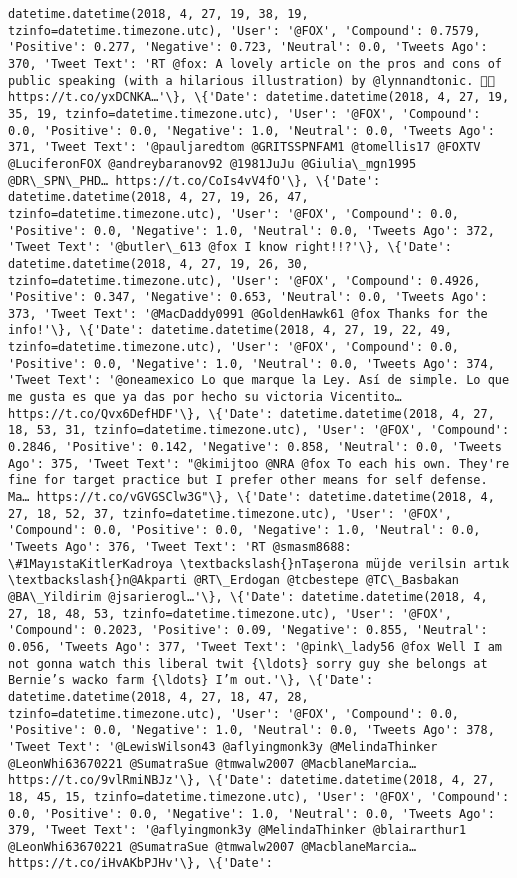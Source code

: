 \documentclass[11pt]{article}
\begin{document}
\begin{Verbatim}[commandchars=\\\{\}]
datetime.datetime(2018, 4, 27, 19, 38, 19, tzinfo=datetime.timezone.utc), 'User': '@FOX', 'Compound': 0.7579, 'Positive': 0.277, 'Negative': 0.723, 'Neutral': 0.0, 'Tweets Ago': 370, 'Tweet Text': 'RT @fox: A lovely article on the pros and cons of public speaking (with a hilarious illustration) by @lynnandtonic. 👏🏻 https://t.co/yxDCNKA…'\}, \{'Date': datetime.datetime(2018, 4, 27, 19, 35, 19, tzinfo=datetime.timezone.utc), 'User': '@FOX', 'Compound': 0.0, 'Positive': 0.0, 'Negative': 1.0, 'Neutral': 0.0, 'Tweets Ago': 371, 'Tweet Text': '@pauljaredtom @GRITSSPNFAM1 @tomellis17 @FOXTV @LuciferonFOX @andreybaranov92 @1981JuJu @Giulia\_mgn1995 @DR\_SPN\_PHD… https://t.co/CoIs4vV4fO'\}, \{'Date': datetime.datetime(2018, 4, 27, 19, 26, 47, tzinfo=datetime.timezone.utc), 'User': '@FOX', 'Compound': 0.0, 'Positive': 0.0, 'Negative': 1.0, 'Neutral': 0.0, 'Tweets Ago': 372, 'Tweet Text': '@butler\_613 @fox I know right!!?'\}, \{'Date': datetime.datetime(2018, 4, 27, 19, 26, 30, tzinfo=datetime.timezone.utc), 'User': '@FOX', 'Compound': 0.4926, 'Positive': 0.347, 'Negative': 0.653, 'Neutral': 0.0, 'Tweets Ago': 373, 'Tweet Text': '@MacDaddy0991 @GoldenHawk61 @fox Thanks for the info!'\}, \{'Date': datetime.datetime(2018, 4, 27, 19, 22, 49, tzinfo=datetime.timezone.utc), 'User': '@FOX', 'Compound': 0.0, 'Positive': 0.0, 'Negative': 1.0, 'Neutral': 0.0, 'Tweets Ago': 374, 'Tweet Text': '@oneamexico Lo que marque la Ley. Así de simple. Lo que me gusta es que ya das por hecho su victoria Vicentito… https://t.co/Qvx6DefHDF'\}, \{'Date': datetime.datetime(2018, 4, 27, 18, 53, 31, tzinfo=datetime.timezone.utc), 'User': '@FOX', 'Compound': 0.2846, 'Positive': 0.142, 'Negative': 0.858, 'Neutral': 0.0, 'Tweets Ago': 375, 'Tweet Text': "@kimijtoo @NRA @fox To each his own. They're fine for target practice but I prefer other means for self defense. Ma… https://t.co/vGVGSClw3G"\}, \{'Date': datetime.datetime(2018, 4, 27, 18, 52, 37, tzinfo=datetime.timezone.utc), 'User': '@FOX', 'Compound': 0.0, 'Positive': 0.0, 'Negative': 1.0, 'Neutral': 0.0, 'Tweets Ago': 376, 'Tweet Text': 'RT @smasm8688: \#1MayıstaKitlerKadroya \textbackslash{}nTaşerona müjde verilsin artık \textbackslash{}n@Akparti @RT\_Erdogan @tcbestepe @TC\_Basbakan @BA\_Yildirim @jsarierogl…'\}, \{'Date': datetime.datetime(2018, 4, 27, 18, 48, 53, tzinfo=datetime.timezone.utc), 'User': '@FOX', 'Compound': 0.2023, 'Positive': 0.09, 'Negative': 0.855, 'Neutral': 0.056, 'Tweets Ago': 377, 'Tweet Text': '@pink\_lady56 @fox Well I am not gonna watch this liberal twit {\ldots} sorry guy she belongs at Bernie’s wacko farm {\ldots} I’m out.'\}, \{'Date': datetime.datetime(2018, 4, 27, 18, 47, 28, tzinfo=datetime.timezone.utc), 'User': '@FOX', 'Compound': 0.0, 'Positive': 0.0, 'Negative': 1.0, 'Neutral': 0.0, 'Tweets Ago': 378, 'Tweet Text': '@LewisWilson43 @aflyingmonk3y @MelindaThinker @LeonWhi63670221 @SumatraSue @tmwalw2007 @MacblaneMarcia… https://t.co/9vlRmiNBJz'\}, \{'Date': datetime.datetime(2018, 4, 27, 18, 45, 15, tzinfo=datetime.timezone.utc), 'User': '@FOX', 'Compound': 0.0, 'Positive': 0.0, 'Negative': 1.0, 'Neutral': 0.0, 'Tweets Ago': 379, 'Tweet Text': '@aflyingmonk3y @MelindaThinker @blairarthur1 @LeonWhi63670221 @SumatraSue @tmwalw2007 @MacblaneMarcia… https://t.co/iHvAKbPJHv'\}, \{'Date': 
\end{Verbatim}
\end{document}
